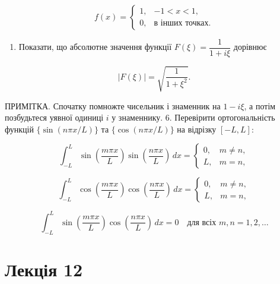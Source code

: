 \documentclass[
  ukrainian,
]{article}
\providecommand{\tightlist}{%
  \setlength{\itemsep}{0pt}\setlength{\parskip}{0pt}}
\begin{document}
\[
f(x)=
\begin{cases}
1, & -1 < x < 1,\\
0, & \text{в інших точках.}
\end{cases}
\]

\begin{enumerate}
\def\labelenumi{\arabic{enumi}.}
\setcounter{enumi}{4}
\tightlist
\item
  Показати, що абсолютне значення функції \(F(\xi)=\dfrac{1}{1+i\xi}\)
  дорівнює
\end{enumerate}

\[
\left|F(\xi)\right| = \sqrt{\frac{1}{1+\xi^2}}.
\]

ПРИМІТКА. Спочатку помножте чисельник і знаменник на \(1-i\xi\), а потім
позбудьтеся уявної одиниці \(i\) у знаменнику. 6. Перевірити
ортогональність функцій \(\{\sin(n\pi x/L)\}\) та \(\{\cos(n\pi x/L)\}\)
на відрізку \([-L,L]\):

\[
\int_{-L}^{L} \sin\!\left(\frac{m\pi x}{L}\right)\sin\!\left(\frac{n\pi x}{L}\right)\,dx =
\begin{cases}
0, & m \neq n,\\
L, & m = n,
\end{cases}
\]

\[
\int_{-L}^{L} \cos\!\left(\frac{m\pi x}{L}\right)\cos\!\left(\frac{n\pi x}{L}\right)\,dx =
\begin{cases}
0, & m \neq n,\\
L, & m = n,
\end{cases}
\]

\[
\int_{-L}^{L} \sin\!\left(\frac{m\pi x}{L}\right)\cos\!\left(\frac{n\pi x}{L}\right)\,dx = 0
\quad \text{для всіх } m,n=1,2,\dots
\]

\section{Лекція 12}\label{ux43bux435ux43aux446ux456ux44f-12}
\end{document}
